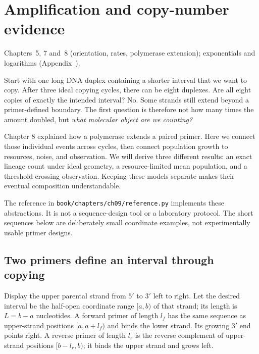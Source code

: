 \chapter{Amplification and copy-number evidence}
\label{ch:amplification}
{Chapters~5, 7 and~8 (orientation, rates, polymerase extension); exponentials and logarithms (Appendix~).}

Start with one long DNA duplex containing a shorter interval that we want to copy. After three ideal copying cycles, there can be eight duplexes. Are all eight copies of exactly the intended interval? No. Some strands still extend beyond a primer-defined boundary. The first question is therefore not how many times the amount doubled, but \emph{what molecular object are we counting?}

Chapter 8 explained how a polymerase extends a paired primer. Here we connect those individual events across cycles, then connect population growth to resources, noise, and observation. We will derive three different results: an exact lineage count under ideal geometry, a resource-limited mean population, and a threshold-crossing observation. Keeping these models separate makes their eventual composition understandable.

The reference in \texttt{book/chapters/ch09/reference.py} implements these abstractions. It is not a sequence-design tool or a laboratory protocol. The short sequences below are deliberately small coordinate examples, not experimentally usable primer designs.

\section{Two primers define an interval through copying}
Display the upper parental strand from $5'$ to $3'$ left to right. Let the desired interval be the half-open coordinate range $[a,b)$ of that strand; its length is $L=b-a$ nucleotides. A forward primer of length $l_f$ has the same sequence as upper-strand positions $[a,a+l_f)$ and binds the lower strand. Its growing $3'$ end points right. A reverse primer of length $l_r$ is the reverse complement of upper-strand positions $[b-l_r,b)$; it binds the upper strand and grows left.

